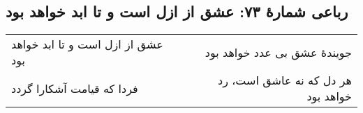 \begin{center}
\section*{رباعی شمارهٔ ۷۳: عشق از ازل است و تا ابد خواهد بود }
\label{sec:073}
\begin{longtable}{l p{0.5cm} r}
عشق از ازل است و تا ابد خواهد بود 
&&
جویندهٔ عشق بی عدد خواهد بود
\\
فردا که قیامت آشکارا گردد
&&
هر دل که نه عاشق است، رد خواهد بود
\\
\end{longtable}
\end{center}
